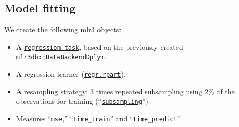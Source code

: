 \documentclass[
]{scrbook}
\newenvironment{Shaded}{\begin{snugshade}}{\end{snugshade}}
\newcommand{\AttributeTok}[1]{\textcolor[rgb]{0.77,0.63,0.00}{#1}}
\newcommand{\DecValTok}[1]{\textcolor[rgb]{0.00,0.00,0.81}{#1}}
\newcommand{\FloatTok}[1]{\textcolor[rgb]{0.00,0.00,0.81}{#1}}
\newcommand{\FunctionTok}[1]{\textcolor[rgb]{0.00,0.00,0.00}{#1}}
\newcommand{\NormalTok}[1]{#1}
\newcommand{\OtherTok}[1]{\textcolor[rgb]{0.56,0.35,0.01}{#1}}
\newcommand{\SpecialCharTok}[1]{\textcolor[rgb]{0.00,0.00,0.00}{#1}}
\newcommand{\StringTok}[1]{\textcolor[rgb]{0.31,0.60,0.02}{#1}}
\providecommand{\tightlist}{%
  \setlength{\itemsep}{0pt}\setlength{\parskip}{0pt}}
\renewenvironment{Shaded} {\begin{snugshade}\small} {\end{snugshade}}
\begin{document}
\hypertarget{model-fitting}{%
\subsection{Model fitting}\label{model-fitting}}

We create the following \href{https://mlr3.mlr-org.com}{mlr3} objects:

\begin{itemize}
\tightlist
\item
  A \href{https://mlr3.mlr-org.com/reference/TaskRegr.html}{\texttt{regression\ task}}, based on the previously created \href{https://mlr3db.mlr-org.com/reference/DataBackendDplyr.html}{\texttt{mlr3db::DataBackendDplyr}}.
\item
  A regression learner (\href{https://mlr3.mlr-org.com/reference/mlr_learners_regr.rpart.html}{\texttt{regr.rpart}}).
\item
  A resampling strategy: 3 times repeated subsampling using 2\% of the observations for training (``\href{https://mlr3.mlr-org.com/reference/mlr_resamplings_subsampling.html}{\texttt{subsampling}}'')
\item
  Measures ``\href{https://mlr3.mlr-org.com/reference/mlr_measures_regr.mse.html}{\texttt{mse}},'' ``\href{https://mlr3.mlr-org.com/reference/mlr_measures_elapsed_time.html}{\texttt{time\_train}}'' and ``\href{https://mlr3.mlr-org.com/reference/mlr_measures_elapsed_time.html}{\texttt{time\_predict}}''
\end{itemize}

\begin{Shaded}
\end{Shaded}
\end{document}
